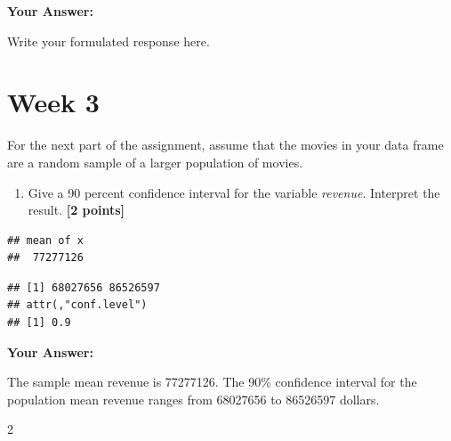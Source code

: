 \documentclass[
]{article}
\newenvironment{Shaded}{\begin{snugshade}}{\end{snugshade}}
\newcommand{\AttributeTok}[1]{\textcolor[rgb]{0.13,0.29,0.53}{#1}}
\newcommand{\CommentTok}[1]{\textcolor[rgb]{0.56,0.35,0.01}{\textit{#1}}}
\newcommand{\FloatTok}[1]{\textcolor[rgb]{0.00,0.00,0.81}{#1}}
\newcommand{\FunctionTok}[1]{\textcolor[rgb]{0.13,0.29,0.53}{\textbf{#1}}}
\newcommand{\NormalTok}[1]{#1}
\newcommand{\OtherTok}[1]{\textcolor[rgb]{0.56,0.35,0.01}{#1}}
\newcommand{\SpecialCharTok}[1]{\textcolor[rgb]{0.81,0.36,0.00}{\textbf{#1}}}
\providecommand{\tightlist}{%
  \setlength{\itemsep}{0pt}\setlength{\parskip}{0pt}}
\begin{document}
\textbf{Your Answer:}

Write your formulated response here.

\section{Week 3}\label{week-3}

For the next part of the assignment, assume that the movies in your data
frame are a random sample of a larger population of movies.

\begin{enumerate}
\def\labelenumi{\arabic{enumi}.}
\tightlist
\item
  Give a 90 percent confidence interval for the variable \emph{revenue}.
  Interpret the result. \textbf{[2 points]}
\end{enumerate}

\begin{Shaded}
\end{Shaded}

\begin{verbatim}
## mean of x 
##  77277126
\end{verbatim}

\begin{Shaded}
\end{Shaded}

\begin{verbatim}
## [1] 68027656 86526597
## attr(,"conf.level")
## [1] 0.9
\end{verbatim}

\textbf{Your Answer:}

The sample mean revenue is 77277126. The 90\% confidence interval for
the population mean revenue ranges from 68027656 to 86526597 dollars.

2
\end{document}
